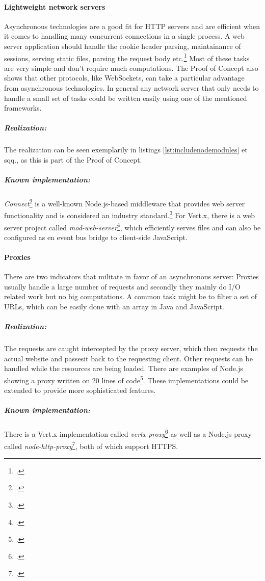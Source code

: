 \paragraph{Lightweight network servers} Asynchronous technologies are a good fit
for HTTP servers and are efficient when it comes to handling many concurrent
connections in a single process. A web server application should handle
the cookie header parsing, maintainance of sessions, serving static files,
parsing the request body etc.\footcite[Cf.][197 et seq,]{teixeira_2012} Most of these
tasks are very simple and don't require much computations.
The Proof of Concept also shows that other
protocols, like WebSockets, can take a particular advantage from asynchronous
technologies. In general any network server that only needs to handle a small set of
tasks could be written easily using one of the mentioned frameworks.
\subparagraph{Realization:} The realization can be seen exemplarily in listings
\ref{lst:includenodemodules} et sqq., as this is part of the Proof of Concept.
\subparagraph{Known implementation:} 
\textit{Connect}\footcite[Cf.][]{Odell_2012} is a well-known Node.js-based middleware that provides
web server functionality and is considered an industry
standard.\footcite[Cf.][145]{Roden_2012} For Vert.x, there is a
web server project called \textit{mod-web-server}\footcite[Cf.][]{vertxmodwebserver_2013}, which
efficiently serves files and can also be configured as en event bus bridge to
client-side JavaScript.

\paragraph{Proxies} There are two indicators that militate in favor of an asynchronous server:
Proxies usually handle a large number of requests and secondly they mainly do I/O related work
but no big computations. A common task might be to filter a set of URLs, which can be
easily done with an array in Java and JavaScript.
\subparagraph{Realization:} The requests are caught intercepted by the proxy server, which then
requests the actual website and passesit back to the requesting
client. Other requests can be handled while the resources are being loaded.
There are examples of Node.js showing a proxy written on 20 lines of code\footcite[Cf.][]{krumins_nodeproxy}.
These implementations could be extended to provide more sophisticated features.
\subparagraph{Known implementation:} There is a Vert.x implementation called
\textit{vertx-proxy}\footcite[Cf.][]{vertxproxy} as well as a Node.js proxy called
\textit{node-http-proxy}\footcite[Cf.][]{nodeproxy}, both of which support HTTPS.


